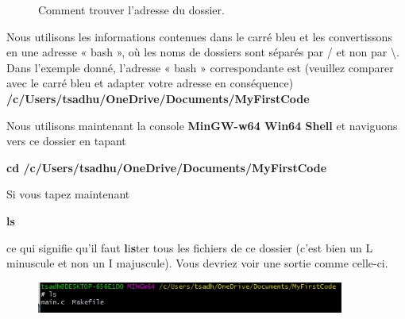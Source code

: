 \documentclass{article}
\begin{document}
\begin{figure}[H]
\begin{subfigure}[c]{0.5\textwidth}
\end{subfigure}
\caption{Comment trouver l'adresse du dossier.\label{F:FindFolderAddress}}
\end{figure}
Nous utilisons les informations contenues dans le carré bleu et les convertissons en une adresse « bash », où les noms de dossiers sont séparés par / et non par \textbackslash. Dans l'exemple donné, l'adresse « bash » correspondante est (veuillez comparer avec le carré bleu et adapter votre adresse en conséquence) \textbf{/c/Users/tsadhu/OneDrive/Documents/MyFirstCode}

Nous utilisons maintenant la console {\color{MidnightBlue}\textbf{MinGW-w64 Win64 Shell}} et naviguons vers ce dossier en tapant
\begin{tcolorbox}[width=\textwidth,colframe=MidnightBlue,colback={black},title={Ceci est la console MinGW-w64 Win64 Shell},outer arc=0mm,colupper=white]    
      \large\textbf{cd /c/Users/tsadhu/OneDrive/Documents/MyFirstCode}
\end{tcolorbox}
Si vous tapez maintenant 
\begin{tcolorbox}[width=\textwidth,colframe=MidnightBlue,colback={black},title={Ceci est la console MinGW-w64 Win64 Shell},outer arc=0mm,colupper=white]    
      \large\textbf{ls}
\end{tcolorbox}
ce qui signifie qu'il faut \textbf{l}i\textbf{s}ter tous les fichiers de ce dossier (c'est bien un L minuscule  et non un I majuscule). Vous devriez voir une sortie comme celle-ci.
\begin{figure}[H]
\center
\includegraphics[width=0.9\textwidth]{Plots/FirstCode_5.jpeg}
\end{figure}
\end{document}
